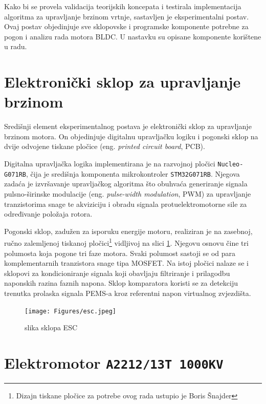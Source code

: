 \documentclass[diplomskirad]{fer}
\begin{document}
Kako bi se provela validacija teorijskih koncepata i testirala implementacija
algoritma za upravljanje brzinom vrtnje, sastavljen je eksperimentalni postav.
Ovaj postav objedinjuje sve sklopovske i programske komponente potrebne za
pogon i analizu rada motora BLDC. U nastavku su opisane komponente korištene u
radu.

\section{Elektronički sklop za upravljanje brzinom}
\label{sec:esc}

Središnji element eksperimentalnog postava je elektronički sklop za upravljanje
brzinom motora. On objedinjuje digitalnu upravljačku logiku i pogonski sklop na
dvije odvojene tiskane pločice (eng. \textit{printed circuit board}, PCB).

Digitalna upravljačka logika implementirana je na razvojnoj pločici
\texttt{Nucleo-G071RB}, čija je središnja komponenta mikrokontroler
\texttt{STM32G071RB}. Njegova zadaća je izvršavanje upravljačkog algoritma što
obuhvaća generiranje signala pulsno-širinske modulacije (eng.
\textit{pulse-width modulation}, PWM) za upravljanje tranzistorima snage te
akviziciju i obradu signala protuelektromotorne sile za određivanje položaja
rotora.

Pogonski sklop, zadužen za isporuku energije motoru, realiziran je na zasebnoj,
ručno zalemljenoj tiskanoj pločici\footnote{Dizajn tiskane pločice za potrebe
	ovog rada ustupio je Boris Šnajder} vidljivoj na slici \ref{fig:esc}. Njegovu
osnovu čine tri polumosta koja pogone tri faze motora. Svaki polumost sastoji
se od para komplementarnih tranzistora snage tipa MOSFET. Na istoj pločici
nalaze se i sklopovi za kondicioniranje signala koji obavljaju filtriranje i
prilagodbu naponskih razina faznih napona. Sklop komparatora koristi se za
detekciju trenutka prolaska signala PEMS-a kroz referentni napon virtualnog
zvjezdišta.
\begin{figure}[h!]
	\centering
	\texttt{[image: Figures/esc.jpeg]}
	\caption{slika sklopa ESC}
	\label{fig:esc}
\end{figure}

\section{Elektromotor \texttt{A2212/13T 1000KV}}
\label{sec:motor}
\end{document}
